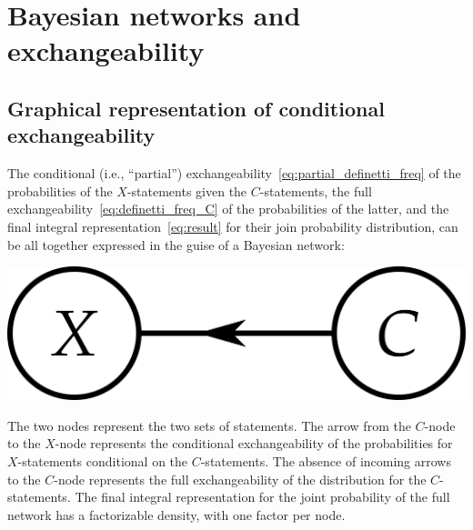 \documentclass[\ifafour a4paper,12pt,\else a5paper,10pt,\fi%
onecolumn,oneside,article,%
british%
]{memoir}
\theoremstyle{remark}
\theoremstyle{innote}
\renewcommand*{\|}[1][]{\nonscript\,#1\vert\nonscript\,\mathopen{}}
\newcommand*{\ie}{{i.e.}}
\renewcommand*{\=}{\TextOrMath\texteq\eq}
\begin{document}
\section{Bayesian networks and exchangeability}
\label{sec:exch_nets}

\subsection{Graphical representation of conditional exchangeability}
\label{sec:graph_repr}

The conditional (\ie, \enquote{partial})
exchangeability~\eqref{eq:partial_definetti_freq} of the probabilities of
the $X$-statements given the $C$-statements, the full
exchangeability~\eqref{eq:definetti_freq_C} of the probabilities of the
latter, and the final integral representation~\eqref{eq:result} for their
join probability distribution, can be all together expressed in the guise
of a Bayesian network:
\begin{center}%
\includegraphics[scale=0.5]{bayesnet1.png}
\figcaption{\label{fig:simplenet}}  
\end{center}%
The two nodes represent the two sets of statements. The arrow from the
$C$-node to the $X$-node represents the conditional exchangeability of the
probabilities for $X$-statements conditional on the $C$-statements. The
absence of incoming arrows to the $C$-node represents the full
exchangeability of the distribution for the $C$-statements. The final
integral representation for the joint probability of the full network has a
factorizable density, with one factor per node.
\end{document}
